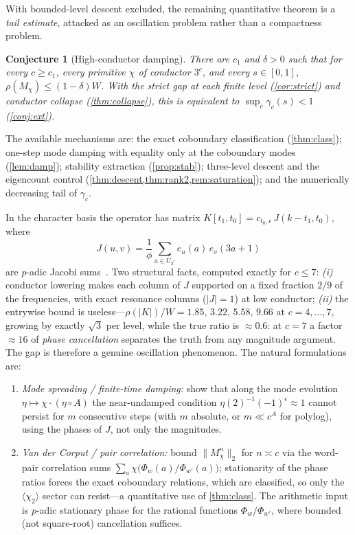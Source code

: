 \documentclass[11pt]{article}
\theoremstyle{plain}
\newtheorem{conjecture}{Conjecture}
\theoremstyle{definition}
\theoremstyle{remark}
\begin{document}
With bounded-level descent excluded, the remaining quantitative theorem is a
\emph{tail estimate}, attacked as an oscillation problem rather than a
compactness problem.

\begin{conjecture}[High-conductor damping]\label{conj:hcd}
There are $c_1$ and $\delta>0$ such that for every $c\ge c_1$, every primitive
$\chi$ of conductor $3^c$, and every $s\in[0,1]$,
$\rho(M_\chi)\le(1-\delta)W$. With the strict gap at each finite level
(\cref{cor:strict}) and conductor collapse (\cref{thm:collapse}), this is
equivalent to $\sup_c\gamma_c(s)<1$ (\cref{conj:ext}).
\end{conjecture}

\noindent The available mechanisms are: the exact coboundary classification
(\cref{thm:class}); one-step mode damping with equality only at the coboundary
modes (\cref{lem:damp}); stability extraction (\cref{prop:stab}); three-level
descent and the eigencount control (\cref{thm:descent,thm:rank2,rem:saturation});
and the numerically decreasing tail of $\gamma_c$.

In the character basis the operator has matrix
$K[t_1,t_0]=c_{t_0,\epsilon}\,J(k-t_1,t_0)$, where
\[
J(u,v)=\frac1\phi\sum_{a\in U_{3^c}}e_u(a)\,e_v(3a+1)
\]
are $p$-adic Jacobi sums~\cite{bew1998,iwanieckowalski}. Two structural facts, computed exactly for
$c\le7$: \emph{(i)} conductor lowering makes each column of $J$ supported on a
fixed fraction $2/9$ of the frequencies, with exact resonance columns
($\lvert J\rvert=1$) at low conductor; \emph{(ii)} the entrywise bound is
useless---$\rho(\lvert K\rvert)/W=1.85,\,3.22,\,5.58,\,9.66$ at $c=4,\dots,7$,
growing by exactly $\sqrt3$ per level, while the true ratio is
$\approx0.6$: at $c=7$ a factor $\approx16$ of \emph{phase cancellation}
separates the truth from any magnitude argument. The gap is therefore a genuine
oscillation phenomenon. The natural formulations are:

\begin{enumerate}[leftmargin=1.6em]
\item \emph{Mode spreading / finite-time damping:} show that along the mode
evolution $\eta\mapsto\chi\cdot(\eta\circ A)$ the near-undamped condition
$\eta(2)^{-1}(-1)^\epsilon\approx1$ cannot persist for $m$ consecutive steps
(with $m$ absolute, or $m\ll c^A$ for polylog), using the phases of $J$, not
only the magnitudes.
\item \emph{Van der Corput / pair correlation:} bound
$\lVert M_\chi^n\rVert_2$ for $n\asymp c$ via the word-pair correlation sums
$\sum_a\chi\bigl(\Phi_w(a)/\Phi_{w'}(a)\bigr)$; stationarity of the phase
ratios forces the exact coboundary relations, which are classified, so only
the $\langle\chi_2\rangle$ sector can resist---a quantitative use of
\cref{thm:class}. The arithmetic input is $p$-adic stationary phase for the
rational functions $\Phi_w/\Phi_{w'}$, where bounded (not square-root)
cancellation suffices.
\end{enumerate}
\end{document}
